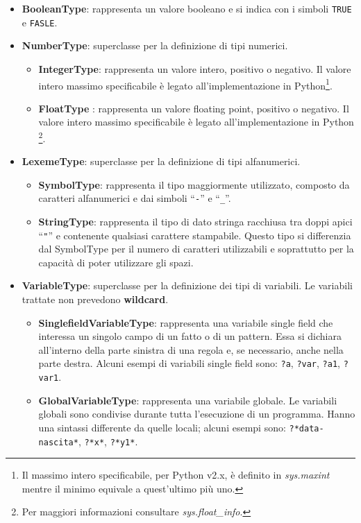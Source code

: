 \begin{itemize}
	\item \textbf{BooleanType}: rappresenta un valore booleano e si indica con i simboli \verb!TRUE! e \verb!FASLE!.
	\item \textbf{NumberType}: superclasse per la definizione di tipi numerici.
		\begin{itemize}
			\item \textbf{IntegerType}: rappresenta un valore intero, positivo o negativo. Il valore intero massimo specificabile è legato all'implementazione in Python\footnote{Il massimo intero specificabile, per Python v2.x, è definito in \emph{sys.maxint} mentre il minimo equivale a quest'ultimo più uno.}.
			\item \textbf{FloatType} :  rappresenta un valore floating point, positivo o negativo. Il valore intero massimo specificabile è legato all'implementazione in Python \footnote{Per maggiori informazioni consultare \emph{sys.float_info}.}.
		\end{itemize}
	\item \textbf{LexemeType}: superclasse per la definizione di tipi alfanumerici.
		\begin{itemize}
			\item \textbf{SymbolType}: rappresenta il tipo maggiormente utilizzato, composto da caratteri alfanumerici e dai simboli ``\verb!-!'' e ``\verb!_!''.
			\item \textbf{StringType}: rappresenta il tipo di dato stringa racchiusa tra doppi apici ``\verb!"!'' e contenente qualsiasi carattere stampabile. Questo tipo si differenzia dal SymbolType per il numero di caratteri utilizzabili e soprattutto per la capacità di poter utilizzare gli spazi.  
		\end{itemize}
	\item \textbf{VariableType}: superclasse per la definizione dei tipi di variabili. Le variabili trattate non prevedono \textbf{wildcard}.
		\begin{itemize}
			\item \textbf{SinglefieldVariableType}: rappresenta una variabile single field che interessa un singolo campo di un fatto o di un pattern. Essa si dichiara all'interno della parte sinistra di una regola e, se necessario, anche nella parte destra. Alcuni esempi di variabili single field sono: 
\verb!?a!, \verb!?var!, \verb!?a1!, \verb!?var1!.
			\item \textbf{GlobalVariableType}: rappresenta una variabile globale. Le variabili globali sono condivise durante tutta l'esecuzione di un programma. Hanno una sintassi differente da quelle locali; alcuni esempi sono: \verb!?*data-nascita*!, \verb!?*x*!, \verb!?*y1*!.

\end{itemize}
\end{itemize}
